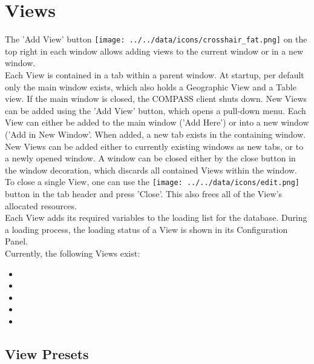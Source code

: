 \section{Views}
\label{sec:ui_views}

The 'Add View' button \texttt{[image: ../../data/icons/crosshair\_fat.png]} on the top right in each window allows adding views to the current window or in a new window. \\

Each View is contained in a tab within a parent window.  At startup, per default only the main window exists, which also holds
a Geographic View and a Table view. If the main window is closed, the COMPASS client shuts down. New Views can be added using the 'Add View' button, which opens a pull-down menu. Each View can either be added to the main window ('Add Here') or into a new window ('Add in New Window'. When added, a new tab exists in the containing window. \\

New Views can be added either to currently existing windows as new tabs, or to a newly opened window. A window can be closed either by the close button in the window decoration, which discards all contained Views within the window.  \\

To close a single View, one can use the \texttt{[image: ../../data/icons/edit.png]} button in the tab header and press 'Close'.
This also frees all of the View's allocated resources. \\

Each View adds its required variables to the loading list for the database. During a loading process, the loading status of a View is shown in its Configuration Panel.\\

Currently, the following Views exist:
\begin{itemize}
 \item {}
 \item {}
 \item {}
 \item {}
 \item {}
\end{itemize}

\subsection{View Presets}


